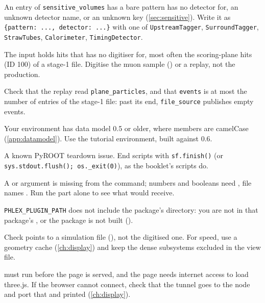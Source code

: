 An entry of \texttt{sensitive\_volumes} has a bare pattern  has
no detector for, an unknown detector name, or an unknown key
(\cref{sec:sensitive}). Write it as \texttt{\{pattern: ..., detector: ...\}}
with one of \texttt{UpstreamTagger}, \texttt{SurroundTagger},
\texttt{StrawTubes}, \texttt{Calorimeter}, \texttt{TimingDetector}.

The input holds hits that  has no digitiser for, most often the
scoring-plane hits (ID 100) of a stage-1 file. Digitise the muon sample
() or a replay, not the production.

Check that the replay read \texttt{plane\_particles}, and that
\texttt{events} is at most the number of entries of the stage-1 file: past
its end, \texttt{file\_source} publishes empty events.

Your environment has data model 0.5 or older, where members are camelCase
(\cref{app:datamodel}). Use the tutorial environment, built against 0.6.

A known PyROOT teardown issue. End scripts with \texttt{sf.finish()} (or
\texttt{sys.stdout.flush(); os.\_exit(0)}), as the booklet's scripts do.

A  or  argument is missing from the
 command; numbers and booleans need , file
names . Run the  part alone to see what
 would receive.

\texttt{PHLEX\_PLUGIN\_PATH} does not include the package's 
directory: you are not in that package's , or the package is
not built ().

Check  points to a simulation file (),
not the digitised one.
For speed, use a geometry cache (\cref{ch:display}) and keep the dense
subsystems excluded in the view file.

 must run before the page is served, and the page
needs internet access to load three.js. If the browser cannot connect, check
that the tunnel goes to the node and port that  and
 printed (\cref{ch:display}).
